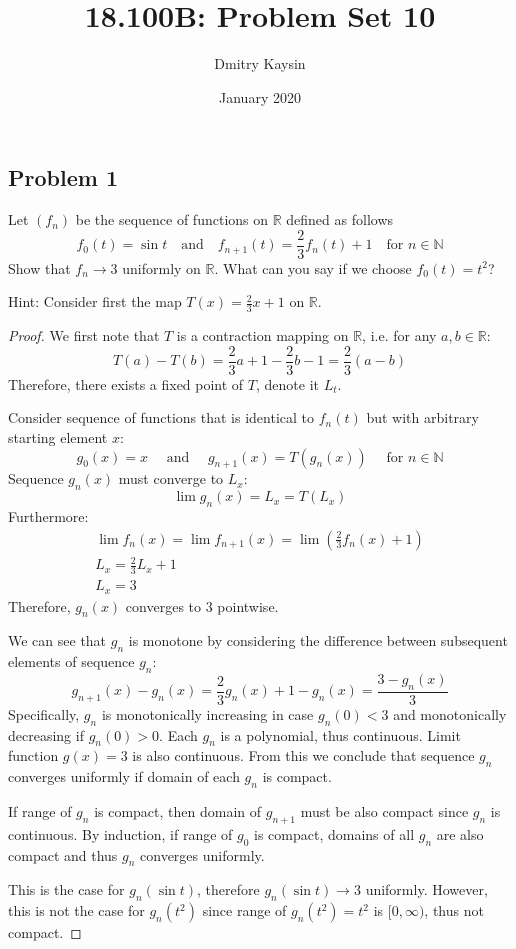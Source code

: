 \documentclass{article}
\title{18.100B: Problem Set 10}
\author{Dmitry Kaysin}
\date{January 2020}
\newcommand{\R}{\mathbb{R}}
\newcommand{\N}{\mathbb{N}}
\begin{document}
\maketitle 


\subsection*{Problem 1}

\begin{tcolorbox}
Let $(f_n)$ be the sequence of functions on $\R$ defined as follows
\[ f_0(t) = \sin t \>\>\> \text{ and } \>\>\> f_{n+1}(t) = \frac{2}{3}f_n(t)+1 \>\>\> \text{ for $n \in \N$} \]
Show that $f_n \to 3$ uniformly on $\R$. What can you say if we choose $f_0(t) = t^2$?

Hint: Consider first the map $T(x) = \frac{2}{3}x + 1$ on $\R$.
\end{tcolorbox}

\begin{proof}

We first note that $T$ is a contraction mapping on $\R$, i.e. for any $a,b \in \R$:
\[ T(a) - T(b) = \frac{2}{3}a+1 - \frac{2}{3}b-1 = \frac{2}{3}(a-b) \]
Therefore, there exists a fixed point of $T$, denote it $L_t$.

Consider sequence of functions that is identical to $f_n(t)$ but with arbitrary starting element $x$:
\[ g_0(x) = x \quad \text{ and } \quad g_{n+1}(x) = T(g_n(x)) \quad \text{ for $n \in \N$} \]
Sequence $g_n(x)$ must converge to $L_x$:
\[ \lim g_n(x) = L_x = T(L_x) \]
Furthermore:
\begin{gather*}
    \lim f_{n}(x) = \lim f_{n+1}(x) = \lim \left( \frac{2}{3}f_n(x)+1 \right) \\
    L_x = \frac{2}{3} L_x +1 \\
    L_x = 3    
\end{gather*}
Therefore, $g_n(x)$ converges to $3$ pointwise.

We can see that $g_n$ is monotone by considering the difference between subsequent elements of sequence $g_n$:
\[ g_{n+1}(x) - g_n(x) = \frac{2}{3}g_n(x) + 1 - g_n(x) = \frac{3-g_n(x)}{3} \]
Specifically, $g_n$ is monotonically increasing in case $g_n(0) < 3$ and monotonically decreasing if $g_n(0) > 0$.
Each $g_n$ is a polynomial, thus continuous.
Limit function $g(x)=3$ is also continuous.
From this we conclude that sequence $g_n$ converges uniformly if domain of each $g_n$ is compact.

If range of $g_n$ is compact, then domain of $g_{n+1}$ must be also compact since $g_n$ is continuous.
By induction, if range of $g_0$ is compact, domains of all $g_n$ are also compact and thus $g_n$ converges uniformly.

This is the case for $g_n(\sin t)$, therefore $g_n(\sin t) \to 3$ uniformly.
However, this is not the case for $g_n(t^2)$ since range of $g_n(t^2) = t^2$ is $[0,\infty)$, thus not compact.

\end{proof}
\end{document}
